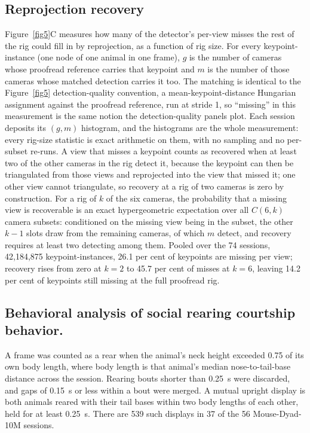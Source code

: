 \documentclass[pdflatex, sn-nature]{sn-jnl}
\theoremstyle{thmstyleone}%
\theoremstyle{thmstyletwo}%
\theoremstyle{thmstylethree}%
\begin{document}
\subsection{Reprojection recovery}\label{methods-recovery}

Figure~\ref{fig5}C measures how many of the detector's per-view misses the rest of the rig could fill in by reprojection, as a function of rig size. For every keypoint-instance (one node of one animal in one frame), $g$ is the number of cameras whose proofread reference carries that keypoint and $m$ is the number of those cameras whose matched detection carries it too. The matching is identical to the Figure~\ref{fig5} detection-quality convention, a mean-keypoint-distance Hungarian assignment against the proofread reference, run at stride 1, so ``missing'' in this measurement is the same notion the detection-quality panels plot. Each session deposits its $(g, m)$ histogram, and the histograms are the whole measurement: every rig-size statistic is exact arithmetic on them, with no sampling and no per-subset re-runs. A view that misses a keypoint counts as recovered when at least two of the other cameras in the rig detect it, because the keypoint can then be triangulated from those views and reprojected into the view that missed it; one other view cannot triangulate, so recovery at a rig of two cameras is zero by construction. For a rig of $k$ of the six cameras, the probability that a missing view is recoverable is an exact hypergeometric expectation over all $C(6,k)$ camera subsets: conditioned on the missing view being in the subset, the other $k-1$ slots draw from the remaining cameras, of which $m$ detect, and recovery requires at least two detecting among them. Pooled over the 74 sessions, 42,184,875 keypoint-instances, 26.1 per cent of keypoints are missing per view; recovery rises from zero at $k = 2$ to 45.7 per cent of misses at $k = 6$, leaving 14.2 per cent of keypoints still missing at the full proofread rig.

\subsection{Behavioral analysis of social rearing courtship behavior.}\label{methods-behavior}

A frame was counted as a rear when the animal's neck height exceeded 0.75 of its own body length, where body length is that animal's median nose-to-tail-base distance across the session. Rearing bouts shorter than 0.25~s were discarded, and gaps of 0.15~s or less within a bout were merged. A mutual upright display is both animals reared with their tail bases within two body lengths of each other, held for at least 0.25~s. There are 539 such displays in 37 of the 56 Mouse-Dyad-10M sessions.
\end{document}
